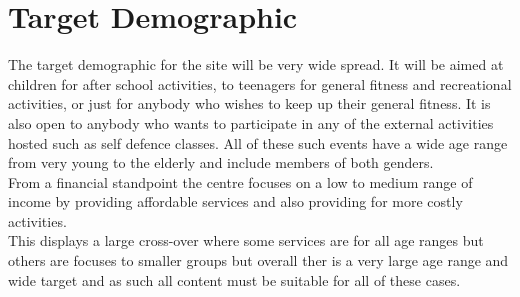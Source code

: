 \documentclass{article}
\begin{document}
\section{Target Demographic}
The target demographic for the site will be very wide spread.  It will be aimed at children for after school activities, to teenagers for general fitness and recreational activities, or just for anybody who wishes to keep up their general fitness.  It is also open to anybody who wants to participate in any of the external activities hosted such as self defence classes.  All of these such events have a wide age range from very young to the elderly and include members of both genders.
\\From a financial standpoint the centre focuses on a low to medium range of income by providing affordable services and also providing for more costly activities.
\\This displays a large cross-over where some services are for all age ranges but others are focuses to smaller groups but overall ther is a very large age range and wide target and as such all content must be suitable for all of these cases.
\end{document}
